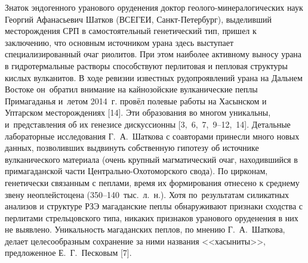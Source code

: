 Знаток эндогенного уранового оруденения доктор геолого-минералогических наук Георгий Афанасьевич Шатков (ВСЕГЕИ, Санкт-Петербург), выделивший месторождения СРП в самостоятельный генетический тип, пришел к заключению, что основным источником урана здесь выступает специализированный очаг риолитов. При этом наиболее активному выносу урана в гидротермальные растворы способствуют перлитовая и пепловая структуры кислых вулканитов. В ходе ревизии известных рудопроявлений урана на Дальнем Востоке он~обратил внимание на кайнозойские вулканические пеплы Примагаданья и~летом 2014~г. провёл полевые работы на Хасынском и Уптарском месторождениях [14]. Эти образования во многом уникальны, и~представления об их генезисе дискуссионны [3, 6, 7, 9--12, 14]. Детальные лабораторные исследования Г.~А.~Шаткова с соавторами принесли много новых данных, позволивших выдвинуть собственную гипотезу об источнике вулканического материала (очень крупный магматический очаг, находившийся в примагаданской части Центрально-Охотоморского свода). По цирконам, генетически связанным с пеплами, время их формирования отнесено к среднему звену неоплейстоцена (350--140~тыс.~л.~н.). Хотя по~результатам силикатных анализов и структуре РЗЭ магаданские пеплы обнаруживают признаки сходства с перлитами стрельцовского типа, никаких признаков уранового оруденения в них не выявлено. Уникальность магаданских пеплов, по мнению Г.~А.~Шаткова, делает целесообразным сохранение за ними названия <<хасыниты>>, предложенное Е.~Г.~Песковым [7].


